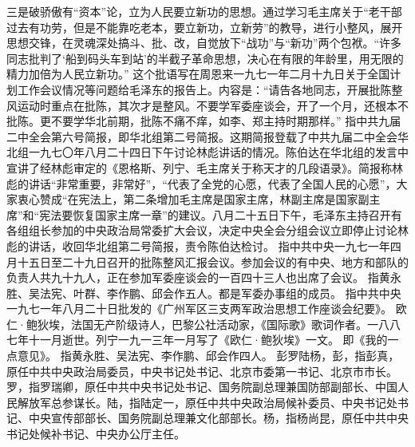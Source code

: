 \begin{maonote}
三是破骄傲有“资本”论，立为人民要立新功的思想。通过学习毛主席关于“老干部过去有功劳，但是不能靠吃老本，要立新功，立新劳”的教导，进行小整风，展开思想交锋，在灵魂深处搞斗、批、改，自觉放下“战功”与“新功”两个包袱。“许多同志批判了‘船到码头车到站’的半截子革命思想，决心在有限的年龄里，用无限的精力加倍为人民立新功。”
这个批语写在周恩来一九七一年二月十九日关于全国计划工作会议情况等问题给毛泽东的报告上。内容是：“请告各地同志，开展批陈整风运动时重点在批陈，其次才是整风。不要学军委座谈会，开了一个月，还根本不批陈。更不要学华北前期，批陈不痛不痒，如李、郑主持时期那样。”
指中共九届二中全会第六号简报，即华北组第二号简报。这期简报登载了中共九届二中全会华北组一九七〇年八月二十四日下午讨论林彪讲话的情况。陈伯达在华北组的发言中宣讲了经林彪审定的《恩格斯、列宁、毛主席关于称天才的几段语录》。简报称林彪的讲话“非常重要，非常好”，“代表了全党的心愿，代表了全国人民的心愿”，大家衷心赞成“在宪法上，第二条增加毛主席是国家主席，林副主席是国家副主席”和“宪法要恢复国家主席一章”的建议。八月二十五日下午，毛泽东主持召开有各组组长参加的中央政治局常委扩大会议，决定中央全会分组会议立即停止讨论林彪的讲话，收回华北组第二号简报，责令陈伯达检讨。
指中共中央一九七一年四月十五日至二十九日召开的批陈整风汇报会议。参加会议的有中央、地方和部队的负责人共九十九人，正在参加军委座谈会的一百四十三人也出席了会议。
指黄永胜、吴法宪、叶群、李作鹏、邱会作五人。都是军委办事组的成员。
指中共中央一九七一年八月二十日批发的《广州军区三支两军政治思想工作座谈会纪要》。
欧仁·鲍狄埃，法国无产阶级诗人，巴黎公社活动家，《国际歌》歌词作者。一八八七年十一月逝世。列宁一九一三年一月写了《欧仁·鲍狄埃》一文。
即《我的一点意见》。
指黄永胜、吴法宪、李作鹏、邱会作四人。
彭罗陆杨，彭，指彭真，原任中共中央政治局委员，中央书记处书记、北京市委第一书记、北京市市长。罗，指罗瑞卿，原任中共中央书记处书记、国务院副总理兼国防部副部长、中国人民解放军总参谋长。陆，指陆定一，原任中共中央政治局候补委员、中央书记处书记、中央宣传部部长、国务院副总理兼文化部部长。杨，指杨尚昆，原任中共中央书记处候补书记、中央办公厅主任。

\end{maonote}
